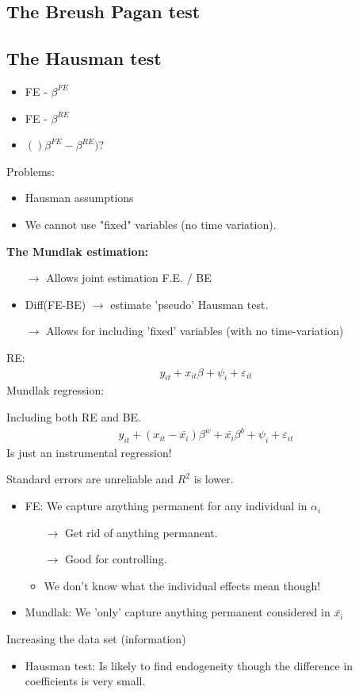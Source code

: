 \begin{multicols}{2}



 \subsection{The Breush Pagan test}


 \subsection{The Hausman test}
 \begin{itemize}
  \item FE - $\beta^{FE}$
  \item FE - $\beta^{RE}$
  \item $()\beta^{FE}-\beta^{RE})$?
 \end{itemize}
 Problems:
 \begin{itemize}
  \item Hausman assumptions
  \item We cannot use "fixed" variables (no time variation).
 \end{itemize}
 \textbf{The Mundlak estimation:}
 \begin{itemize}
  \item[$\rightarrow$] Allows joint estimation F.E. / BE
  \item Diff(FE-BE) $\rightarrow$ estimate 'pseudo' Hausman test.
  \item[$\rightarrow$] Allows for including 'fixed' variables (with no time-variation)
 \end{itemize}
 RE:
 \begin{align*}
  y_{it}+x_{it}\beta+\psi_i+\varepsilon_{it}
 \end{align*}
 Mundlak regression:\par
 Including both RE and BE.
 \begin{align*}
  y_{it}+(x_{it}-\bar{x_i})\beta^w+\bar{x_i}\beta^b +\psi_i+\varepsilon_{it}
 \end{align*}
 Is just an instrumental regression!\par
 Standard errors are unreliable and $R^2$ is lower.
 \begin{itemize}
  \item FE: We capture anything permanent for any individual in $\alpha_i$
        \begin{itemize}
         \item[$\rightarrow$] Get rid of anything permanent.
         \item[$\rightarrow$] Good for controlling.
         \item We don't know what the individual effects mean though!
        \end{itemize}
  \item Mundlak: We 'only' capture anything permanent considered in $\bar{x_i}$
 \end{itemize}
 Increasing the data set (information)
 \begin{itemize}
  \item Hausman test: Is likely to find endogeneity though the difference in coefficients is very small.
 \end{itemize}


\end{multicols}
